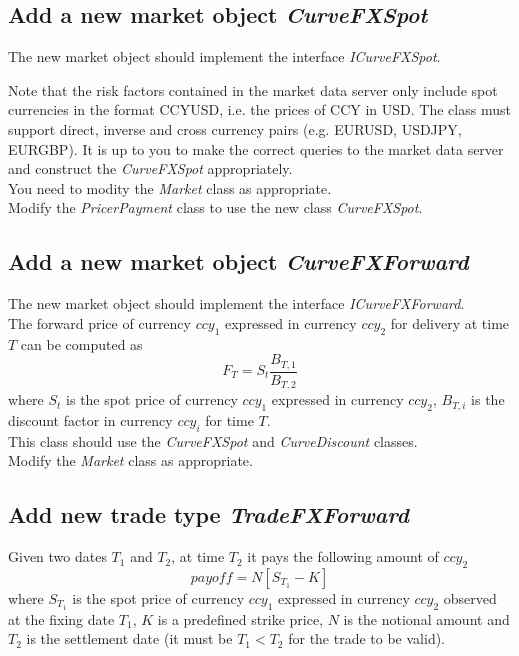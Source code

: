\documentclass[10pt]{article}
\begin{document}
\subsection{Add a new market object \textit{CurveFXSpot}}
The new market object should implement the interface \textit{ICurveFXSpot}.

Note that the risk factors contained in the market data server only include spot currencies in the format CCYUSD, i.e. the prices of CCY in USD. The class must support direct, inverse and cross currency pairs (e.g. EURUSD, USDJPY, EURGBP). It is up to you to make the correct queries to the market data server and construct the \textit{CurveFXSpot} appropriately.\\

You need to modity the \textit{Market} class as appropriate.\\

Modify the \textit{PricerPayment} class to use the new class \textit{CurveFXSpot}.

\subsection{Add a new market object \textit{CurveFXForward}}
The new market object should implement the interface \textit{ICurveFXForward}.\\

The forward price of currency $ccy_1$ expressed in currency $ccy_2$ for delivery at time $T$ can be computed as
$$F_T=S_t \frac{B_{T,1}}{B_{T,2}}$$
where $S_t$ is the spot price of currency $ccy_1$ expressed in currency $ccy_2$, $B_{T,i}$ is the discount factor in currency $ccy_i$ for time $T$.\\

This class should use the \textit{CurveFXSpot} and \textit{CurveDiscount} classes.\\

Modify the \textit{Market} class as appropriate.

\subsection{Add new trade type \textit{TradeFXForward}}
Given two dates $T_1$ and $T_2$, at time $T_2$ it pays the following amount of $ccy_2$
$$
payoff=N[S_{T_1}-K]
$$
where $S_{T_1}$ is the spot price of currency $ccy_1$ expressed in currency $ccy_2$  observed at the fixing date $T_1$, $K$ is a predefined strike price, $N$ is the notional amount and $T_2$ is the settlement date (it must be $T_1<T_2$ for the trade to be valid).\\
\end{document}
